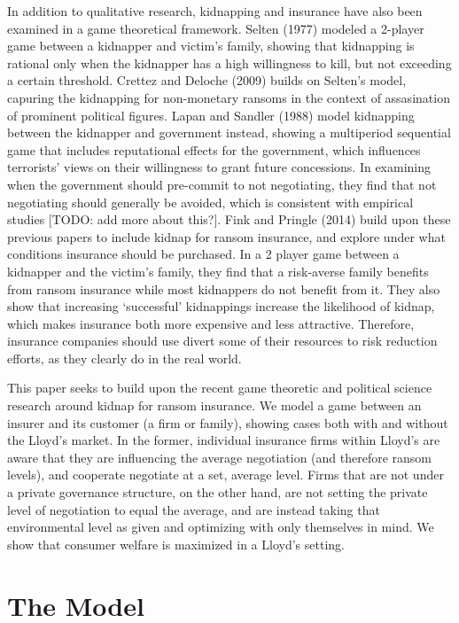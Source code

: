 \documentclass[12pt]{article}
\theoremstyle{plain}
\begin{document}
In addition to qualitative research, kidnapping and insurance have also been examined in a game theoretical framework. Selten (1977) modeled a 2-player game between a kidnapper and victim's family, showing that kidnapping is rational only when the kidnapper has a high willingness to kill, but not exceeding a certain threshold. Crettez and Deloche (2009) builds on Selten's model, capuring the kidnapping for non-monetary ransoms in the context of assasination of prominent political figures. Lapan and Sandler (1988) model kidnapping between the kidnapper and government instead, showing a multiperiod sequential game that includes reputational effects for the government, which influences terrorists' views on their willingness to grant future concessions. In examining when the government should pre-commit to not negotiating, they find that not negotiating should generally be avoided, which is consistent with empirical studies [TODO: add more about this?]. Fink and Pringle (2014) build upon these previous papers to include kidnap for ransom insurance, and explore under what conditions insurance should be purchased. In a 2 player game between a kidnapper and the victim's family, they find that a risk-averse family benefits from ransom insurance while most kidnappers do not benefit from it. They also show that increasing `successful' kidnappings increase the likelihood of kidnap, which makes insurance both more expensive and less attractive. Therefore, insurance companies should use divert some of their resources to risk reduction efforts, as they clearly do in the real world.

This paper seeks to build upon the recent game theoretic and political science research around kidnap for ransom insurance. We model a game between an insurer and its customer (a firm or family), showing cases both with and without the Lloyd's market. In the former, individual insurance firms within Lloyd's are aware that they are influencing the average negotiation (and therefore ransom levels), and cooperate negotiate at a set, average level. Firms that are not under a private governance structure, on the other hand, are not setting the private level of negotiation to equal the average, and are instead taking that environmental level as given and optimizing with only themselves in mind. We show that consumer welfare is maximized in a Lloyd's setting.

\section{The Model}
\end{document}
